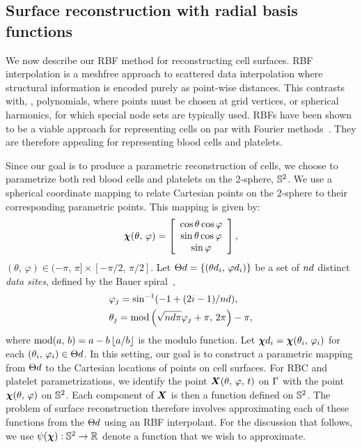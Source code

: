 \subsection{Surface reconstruction with radial basis functions}\label{sec:rbf-interpolation}

We now describe our RBF method for reconstructing cell surfaces. RBF interpolation is a
meshfree approach to scattered data interpolation where structural information is encoded
purely as point-wise distances. This contrasts with, , polynomials, where
points must be chosen at grid vertices, or spherical harmonics, for which special node
sets are typically used. RBFs have been shown to be a viable approach for representing
cells on par with Fourier methods~\cite{Shankar:2013ki}. They are therefore appealing for
representing blood cells and platelets.

Since our goal is to produce a parametric reconstruction of cells, we choose to
parametrize both red blood cells and platelets on the 2-sphere, $\mathbb{S}^2$. We use a
spherical coordinate mapping to relate Cartesian points on the 2-sphere to their
corresponding parametric points. This mapping is given by:
\begin{equation}
    \boldsymbol{\chi}(\theta,\,\varphi) =
    \left[\begin{array}{c}
        \cos\theta\cos\varphi \\
        \sin\theta\cos\varphi \\
        \sin\varphi
    \end{array}\right],
\end{equation}
$(\theta,\,\varphi)\in(-\pi,\,\pi]\times[-\pi/2,\,\pi/2]$.
Let $\data\sites = \{(\data\theta_i,\,\data\varphi_i)\}$ be a set of $\data\cardinality$
distinct \emph{data sites}, defined by the Bauer spiral~\cite{Bauer:2000km},
\begin{equation}\label{eq:bauer-spiral}
    \begin{aligned}
        &\varphi_j = \sin^{-1}(-1 + (2i - 1) / \data\cardinality), \\ %
        &\theta_j = \modulo\left(\sqrt{\data\cardinality\pi}\varphi_j + \pi,\,2\pi\right) - \pi,
    \end{aligned}
\end{equation}
where $\operatorname{mod}(a,\,b) = a - b\left\lfloor{a/b}\right\rfloor$ is the modulo function. Let
$\data\Xp_i=\Xp(\theta_i,\,\varphi_i)$ for each $(\theta_i,\,\varphi_i)\in\data\sites$.
In this setting, our goal is to construct a parametric mapping from $\data\sites$ to the
Cartesian locations of points on cell surfaces. For RBC and platelet parametrizations, we
identify the point $\boldsymbol{X}(\theta,\,\varphi,\,t)$ on $\Gamma$ with the point
$\boldsymbol{\chi}(\theta,\,\varphi)$ on $\mathbb{S}^2$. Each component of $\boldsymbol{X}$ is then a function defined
on $\mathbb{S}^2$. The problem of surface reconstruction therefore involves approximating each
of these functions from the $\data\sites$ using an RBF interpolant. For the discussion
that follows, we use $\psi(\boldsymbol{\chi}) : \mathbb{S}^2 \to \mathbb{R}$ denote a function that we wish
to approximate.

